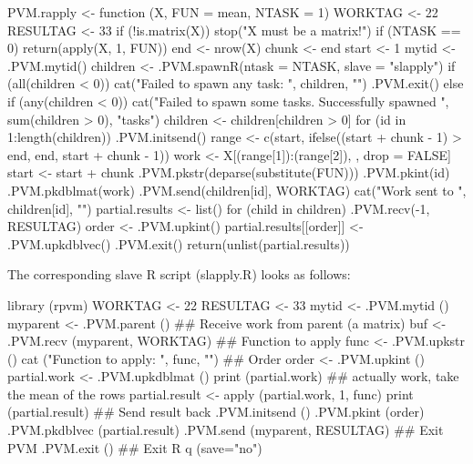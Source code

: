 \begin{Example}
\begin{Scode}

PVM.rapply <- function (X, FUN = mean, NTASK = 1)
{
    WORKTAG <- 22
    RESULTAG <- 33
    if (!is.matrix(X)) {
        stop("X must be a matrix!")
    }
    if (NTASK == 0) {
        return(apply(X, 1, FUN))
    }
    end <- nrow(X)
    chunk <- end%
    start <- 1
    mytid <- .PVM.mytid()
    children <- .PVM.spawnR(ntask = NTASK, slave = "slapply")
    if (all(children < 0)) {
        cat("Failed to spawn any task: ", children, "\n")
        .PVM.exit()
    }
    else if (any(children < 0)) {
        cat("Failed to spawn some tasks.  Successfully spawned ",
            sum(children > 0), "tasks\n")
        children <- children[children > 0]
    }
    for (id in 1:length(children)) {
        .PVM.initsend()
        range <- c(start, ifelse((start + chunk - 1) > end, end,
            start + chunk - 1))
        work <- X[(range[1]):(range[2]), , drop = FALSE]
        start <- start + chunk
        .PVM.pkstr(deparse(substitute(FUN)))
        .PVM.pkint(id)
        .PVM.pkdblmat(work)
        .PVM.send(children[id], WORKTAG)
        cat("Work sent to ", children[id], "\n")
    }
    partial.results <- list()
    for (child in children) {
        .PVM.recv(-1, RESULTAG)
        order <- .PVM.upkint()
        partial.results[[order]] <- .PVM.upkdblvec()
    }
    .PVM.exit()
    return(unlist(partial.results))
}
\end{Scode} 
\label{ex:rpvm-rapplymaster}
\end{Example}

The corresponding slave R script (slapply.R) looks as follows:

\begin{Example}
\begin{Scode}

library (rpvm)
WORKTAG <- 22
RESULTAG <- 33
mytid  <- .PVM.mytid ()
myparent  <- .PVM.parent ()
## Receive work from parent (a matrix)
buf <- .PVM.recv (myparent, WORKTAG)
## Function to apply
func  <- .PVM.upkstr ()
cat ("Function to apply: ", func, "\n")
## Order
order <- .PVM.upkint ()
partial.work <- .PVM.upkdblmat ()
print (partial.work)
## actually work, take the mean of the rows
partial.result <- apply (partial.work, 1, func)
print (partial.result)
## Send result back
.PVM.initsend ()
.PVM.pkint (order)
.PVM.pkdblvec (partial.result)
.PVM.send (myparent, RESULTAG)
## Exit PVM
.PVM.exit ()
## Exit R
q (save="no")
\end{Scode}
\label{ex:rpvm-rapplyslave}
\end{Example}


